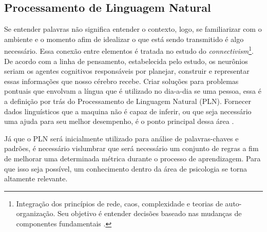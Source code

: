 \subsection{Processamento de Linguagem Natural}
Se entender palavras não significa entender o contexto, logo, se familiarizar com o ambiente e o momento afim de idealizar o que está sendo transmitido é algo necessário. Essa conexão entre elementos é tratada no estudo do \textit{connectivism}\footnote{Integração dos princípios de rede, caos, complexidade e teorias de auto-organização. Seu objetivo é entender decisões baseado nas mudanças de componentes fundamentais \cite{siemens2014connectivism}.}. De acordo com a linha de pensamento, estabelecida pelo estudo, os neurônios seriam os agentes cognitivos responsáveis por planejar, construir e representar essas informações que nosso cérebro recebe. Criar soluções para problemas pontuais que envolvam a língua que é utilizado no dia-a-dia se uma pessoa, essa é a definição por trás do Processamento de Linguagem Natural (PLN). Fornecer dados linguísticos que a maquina não é capaz de inferir, ou que seja necessário uma ajuda para seu melhor desempenho, é o ponto principal dessa área \cite{brandura1996, maria2015npl}.

Já que o PLN será inicialmente utilizado para análise de palavras-chaves e padrões, é necessário vislumbrar que será necessário um conjunto de regras a fim de melhorar uma determinada métrica durante o processo de aprendizagem. Para que isso seja possível, um conhecimento dentro da área de psicologia se torna altamente relevante.
